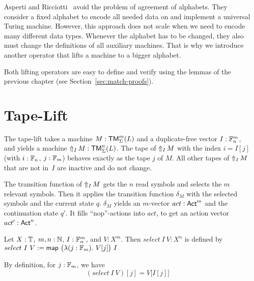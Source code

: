 Asperti and Ricciotti~\cite{asperti2015} avoid the problem of agreement of alphabets.  They consider a fixed alphabet to encode all needed data on and
implement a universal Turing machine.  However, this approach does not scale when we need to encode many different data types.  Whenever the alphabet
has to be changed, they also must change the definitions of all auxiliary machines.  That is why we introduce another operator that lifts a machine to
a bigger alphabet.

Both lifting operators are easy to define and verify using the lemmas of the previous chapter (see Section~\ref{sec:match-proofs}).


\section{Tape-Lift}
\label{sec:n-Lift}
%

The tape-lift takes a machine $M:\TM_\Sigma^m(L)$ and a duplicate-free vector $I: \Fin_n^m$, and yields a machine
$\LiftTapes{M}{I} : \TM_\Sigma^n(L)$.  The tape of $\LiftTapes{M}{I}$ with the index $i = I[j]$ (with $i:\Fin_n$, $j:\Fin_m$) behaves exactly as the
tape $j$ of $M$.  All other tapes of $\LiftTapes{M}{I}$ that are not in~$I$ are inactive and do not change.


The transition function of $\LiftTapes{M}{I}$ gets the $n$ read symbols and selects the $m$ relevant symbols.  Then it applies the transition function
$\delta_M$ with the selected symbols and the current state $q$.  $\delta_M$ yields an $m$-vector $act:\Act^m$ and the continuation state $q'$.  It
fills ``nop''-actions into $act$, to get an action vector $act':\Act^n$.

\begin{definition}
  \label{def:select}
  Let $X:\Type$, $m,n:\Nat$, $I : \Fin_n^m$, and $V : X^m$.  Then $select~I~V : X^n$ is defined by
  $select~I~V := \map{\bigl(\lambda (j:\Fin_m).~V[j] \bigr)}{I}$
\end{definition}
\begin{lemma}
  By definition, for $j:\Fin_m$, we have
  \[
    (select~I~V)[j]=V\bigl[I[j]\bigr]
  \]
\end{lemma}

